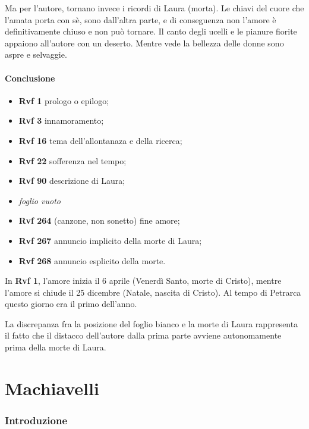 \documentclass[a4paper]{article}
\begin{document}
Ma per l'autore, tornano invece i ricordi di Laura (morta).
Le chiavi del cuore che l'amata porta con sè, sono dall'altra parte, e di conseguenza
non l'amore è definitivamente chiuso e non può tornare.
Il canto degli ucelli e le pianure fiorite appaiono all'autore con un deserto.
Mentre vede la bellezza delle donne sono aspre e selvaggie.

\pagebreak

\subsection{Conclusione}

\begin{itemize}
    \item \textbf{Rvf 1} prologo o epilogo;
    \item \textbf{Rvf 3} innamoramento;
    \item \textbf{Rvf 16} tema dell'allontanaza e della ricerca;
    \item \textbf{Rvf 22} sofferenza nel tempo;
    \item \textbf{Rvf 90} descrizione di Laura;
    \item \textit{foglio vuoto}
    \item \textbf{Rvf 264} (canzone, non sonetto) fine amore;
    \item \textbf{Rvf 267} annuncio implicito della morte di Laura;
    \item \textbf{Rvf 268} annuncio esplicito della morte.
\end{itemize}

In \textbf{Rvf 1}, l'amore inizia il 6 aprile (Venerdì Santo, morte di Cristo),
mentre l'amore si chiude il 25 dicembre (Natale, nascita di Cristo).
Al tempo di Petrarca questo giorno era il primo dell'anno. 

La discrepanza fra la posizione del foglio bianco e la morte di Laura rappresenta il
fatto che il distacco dell'autore dalla prima parte
avviene autonomamente prima della morte di Laura.

\pagebreak

\part{Machiavelli}

\section{Introduzione}
\end{document}
